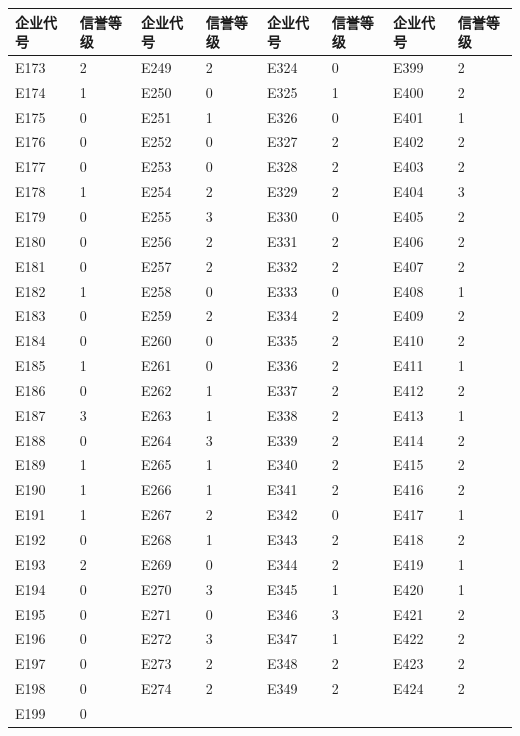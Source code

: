 \documentclass[UTF8]{ctexart}
\begin{document}
			\begin{table}[H]
				\centering
				\begin{tabular}{|l|l|l|l|l|l|l|l|}
				\hline
					企业代号 & 信誉等级 & 企业代号 & 信誉等级 & 企业代号 & 信誉等级 & 企业代号 & 信誉等级 \\ \hline
					E173 & 2 & E249 & 2 & E324 & 0 & E399 & 2 \\ \hline
					E174 & 1 & E250 & 0 & E325 & 1 & E400 & 2 \\ \hline
					E175 & 0 & E251 & 1 & E326 & 0 & E401 & 1 \\ \hline
					E176 & 0 & E252 & 0 & E327 & 2 & E402 & 2 \\ \hline
					E177 & 0 & E253 & 0 & E328 & 2 & E403 & 2 \\ \hline
					E178 & 1 & E254 & 2 & E329 & 2 & E404 & 3 \\ \hline
					E179 & 0 & E255 & 3 & E330 & 0 & E405 & 2 \\ \hline
					E180 & 0 & E256 & 2 & E331 & 2 & E406 & 2 \\ \hline
					E181 & 0 & E257 & 2 & E332 & 2 & E407 & 2 \\ \hline
					E182 & 1 & E258 & 0 & E333 & 0 & E408 & 1 \\ \hline
					E183 & 0 & E259 & 2 & E334 & 2 & E409 & 2 \\ \hline
					E184 & 0 & E260 & 0 & E335 & 2 & E410 & 2 \\ \hline
					E185 & 1 & E261 & 0 & E336 & 2 & E411 & 1 \\ \hline
					E186 & 0 & E262 & 1 & E337 & 2 & E412 & 2 \\ \hline
					E187 & 3 & E263 & 1 & E338 & 2 & E413 & 1 \\ \hline
					E188 & 0 & E264 & 3 & E339 & 2 & E414 & 2 \\ \hline
					E189 & 1 & E265 & 1 & E340 & 2 & E415 & 2 \\ \hline
					E190 & 1 & E266 & 1 & E341 & 2 & E416 & 2 \\ \hline
					E191 & 1 & E267 & 2 & E342 & 0 & E417 & 1 \\ \hline
					E192 & 0 & E268 & 1 & E343 & 2 & E418 & 2 \\ \hline
					E193 & 2 & E269 & 0 & E344 & 2 & E419 & 1 \\ \hline
					E194 & 0 & E270 & 3 & E345 & 1 & E420 & 1 \\ \hline
					E195 & 0 & E271 & 0 & E346 & 3 & E421 & 2 \\ \hline
					E196 & 0 & E272 & 3 & E347 & 1 & E422 & 2 \\ \hline
					E197 & 0 & E273 & 2 & E348 & 2 & E423 & 2 \\ \hline
					E198 & 0 & E274 & 2 & E349 & 2 & E424 & 2 \\ \hline
					E199 & 0 &      &   &      &   &      &    \\ \hline
				\end{tabular}
			\end{table}
			
\end{document}
